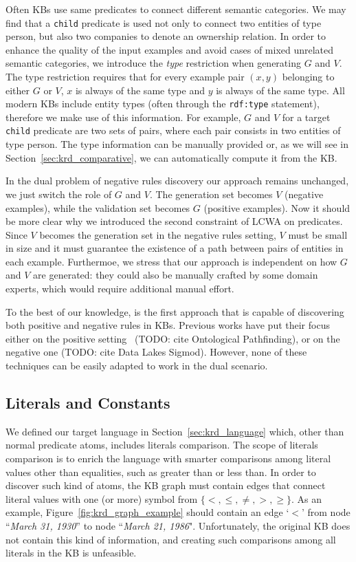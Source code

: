 Often KBs use same predicates to connect different semantic categories. We may find that a \texttt{child} predicate is used not only to connect two entities of type person, but also two companies to denote an ownership relation. In order to enhance the quality of the input examples and avoid cases of mixed unrelated semantic categories, we introduce the \emph{type} restriction when generating $G$ and $V$. The type restriction requires that for every example pair $(x,y)$ belonging to either $G$ or $V$, $x$ is always of the same type and $y$ is always of the same type. All modern KBs include entity types (often through the \texttt{rdf:type} statement), therefore we make use of this information. For example, $G$ and $V$ for a target \texttt{child} predicate are two sets of pairs, where each pair consists in two entities of type person. The type information can be manually provided or, as we will see in Section~\ref{sec:krd_comparative}, we can automatically compute it from the KB.

In the dual problem of negative rules discovery our approach remains unchanged, we just switch the role of $G$ and $V$. The generation set becomes $V$ (negative examples), while the validation set becomes $G$ (positive examples). Now it should be more clear why we introduced the second constraint of LCWA on predicates. Since $V$ becomes the generation set in the negative rules setting, $V$ must be small in size and it must guarantee the existence of a path between pairs of entities in each example. Furthermoe, we stress that our approach is independent on how $G$ and $V$ are generated: they could also be manually crafted by some domain experts, which would require additional manual effort.

To the best of our knowledge, \krd is the first approach that is capable of discovering both positive and negative rules in KBs. Previous works have put their focus either on the positive setting~\cite{abedjan2014amending,galarraga2015fast} (TODO: cite Ontological Pathfinding), or on the negative one (TODO: cite Data Lakes Sigmod). However, none of these techniques can be easily adapted to work in the dual scenario.

\subsection{Literals and Constants}
We defined our target language in Section~\ref{sec:krd_language} which, other than normal predicate atoms, includes literals comparison. The scope of literals comparison is to enrich the language with smarter comparisons among literal values other than equalities, such as greater than or less than. In order to discover such kind of atoms, the KB graph must contain edges that connect literal values with one (or more) symbol from $\{<,\leq,\neq,>,\geq\}$. As an example, Figure~\ref{fig:krd_graph_example} should contain an edge `$<$' from node ``\textit{March 31, 1930}'' to node ``\textit{March 21, 1986}". Unfortunately, the original KB does not contain this kind of information, and creating such comparisons among all literals in the KB is unfeasible.

